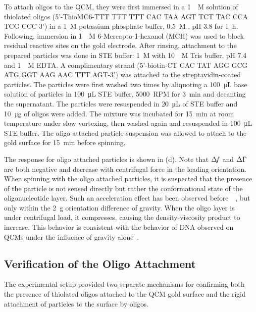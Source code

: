 To attach oligos to the QCM, they were first immersed in a
\SI{1}{\micro\textsc{M}} solution of thiolated oligos (5'-ThioMC6-TTT TTT
TTT CAC TAA AGT TCT TAC CCA TCG CCC-3') in a \SI{1}{\textsc{M}} potassium
phosphate buffer, \SI{0.5}{\textsc{M}} , pH 3.8 for
\SI{1}{\hour}.  Following, immersion in \SI{1}{\milli\textsc{M}}
6-Mercapto-1-hexanol (MCH) was used to block residual reactive sites on the
gold electrode.  After rinsing, attachment to the prepared particles was
done in STE buffer: \SI{1}{\textsc{M}}  with
\SI{10}{\milli\textsc{M}} Tris buffer, pH 7.4 and \SI{1}{\milli\textsc{M}}
EDTA\@.  A complimentary strand (5'-biotin-CT CAC TAT AGG GCG ATG GGT AAG
AAC TTT AGT-3') was attached to the streptavidin-coated particles.  The
particles were first washed two times by aliquoting a
\SI{100}{\micro\liter} base solution of particles in \SI{100}{\micro\liter}
STE buffer, \SI{5000}{RPM} for \SI{3}{\minute} and decanting the
supernatant.  The particles were resuspended in \SI{20}{\micro\liter} of
STE buffer and \SI{10}{\micro\gram} of oligos were added.  The mixture was
incubated for \SI{15}{\minute} at room temperature under slow vortexing,
then washed again and resuspended in \SI{100}{\micro\liter} STE buffer.
The oligo attached particle suspension was allowed to attach to the gold
surface for \SI{15}{\minute} before spinning.

The response for oligo attached particles is shown in
(d).  Note that $\Delta\!f$ and $\Delta\Gamma$ are both negative and
decrease with centrifugal force in the loading orientation.  When spinning
with the oligo attached particles, it is suspected that the presence of the
particle is not sensed directly but rather the conformational state of the
oligonucleotide layer.  Such an acceleration effect has been observed
before~\cite{yoshimoto2002effect}~\cite{fawcett2004evidence}, but only
within the \SI{2}{g} orientation difference of gravity.  When the oligo
layer is under centrifugal load, it compresses, causing the
density-viscosity product to increase.  This behavior is consistent with
the behavior of DNA observed on QCMs under the influence of gravity
alone~\cite{fawcett2004evidence}.

\subsection{Verification of the Oligo Attachment}
The experimental setup provided two separate mechanisms for confirming both
the presence of thiolated oligos attached to the QCM gold surface and the
rigid attachment of particles to the surface by oligos.

